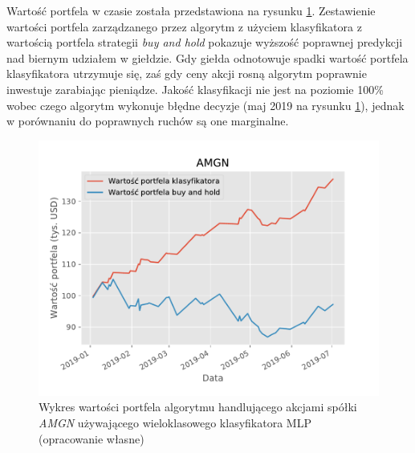 \documentclass[a4paper, twoside, 11pt, openright]{article}
\begin{document}
Wartość portfela w czasie została przedstawiona na rysunku \ref{img:amgn_wallet_value}. Zestawienie wartości portfela zarządzanego przez algorytm z użyciem klasyfikatora z wartością portfela strategii \textit{buy and hold} pokazuje wyższość poprawnej predykcji nad biernym udziałem w giełdzie. Gdy giełda odnotowuje spadki wartość portfela klasyfikatora utrzymuje się, zaś gdy ceny akcji rosną algorytm poprawnie inwestuje zarabiając pieniądze. Jakość klasyfikacji nie jest na poziomie 100\% wobec czego algorytm wykonuje błędne decyzje (maj 2019 na rysunku \ref{img:amgn_wallet_value}), jednak w porównaniu do poprawnych ruchów są one marginalne.

\begin{figure}[H]
\centering \includegraphics[scale=0.9]{img/AMGN-balance-plot.pdf}
\caption{Wykres wartości portfela algorytmu handlującego akcjami spółki \textit{AMGN} używającego wieloklasowego klasyfikatora MLP (opracowanie własne)}
\label{img:amgn_wallet_value}
\end{figure}
\end{document}
